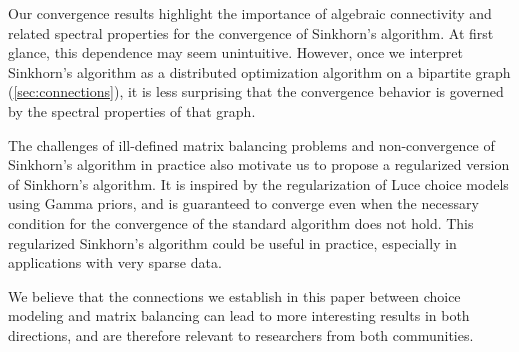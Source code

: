 Our convergence results highlight the importance of algebraic connectivity and related spectral properties for the convergence of Sinkhorn's algorithm. At first glance, this dependence may seem unintuitive. However, once we interpret Sinkhorn's algorithm as a distributed optimization algorithm on a bipartite graph (\cref{sec:connections}), it is less surprising that the convergence behavior is governed by the spectral properties of that graph.

The challenges of ill-defined matrix balancing problems and non-convergence of Sinkhorn's algorithm in practice also motivate us to propose a regularized version of Sinkhorn's algorithm. It is inspired by the regularization of Luce choice models using Gamma priors, and is guaranteed to converge even when the necessary condition for the convergence of the standard algorithm does not hold. This regularized Sinkhorn's algorithm could be useful in practice, especially in applications with very sparse data. 

We believe that the connections we establish in this paper between choice modeling and matrix balancing can lead to more interesting results in both directions, and are therefore relevant to researchers from both communities.
 
